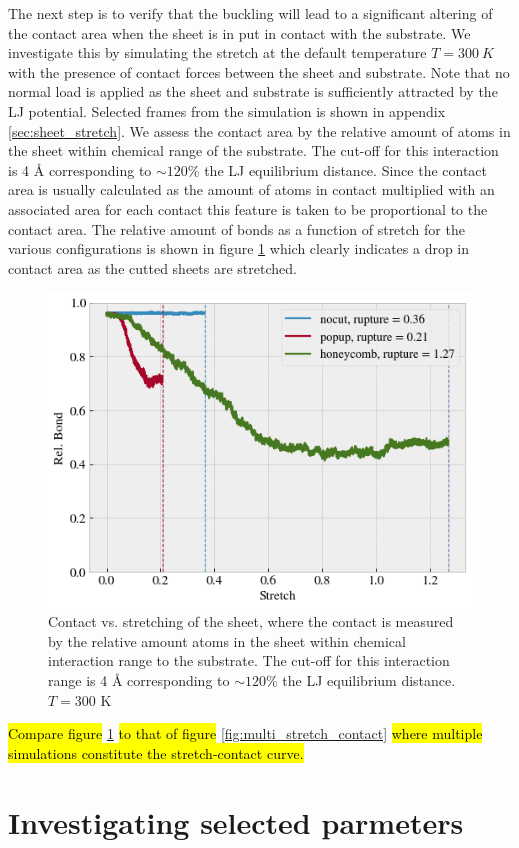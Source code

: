 The next step is to verify that the buckling will lead to a significant altering
of the contact area when the sheet is in put in contact with the substrate. We
investigate this by simulating the stretch at the default temperature $T =
\SI{300}{K}$ with the presence of contact forces between the sheet and
substrate. Note that no normal load is applied as the sheet and substrate is
sufficiently attracted by the LJ potential. Selected frames from the simulation is shown in appendix \cref{sec:sheet_stretch}. We assess the contact area by the
relative amount of atoms in the sheet within chemical range of the substrate.
The cut-off for this interaction is 4 Å corresponding to $\sim 120$\% the LJ
equilibrium distance. Since the contact area is usually calculated as the amount
of atoms in contact multiplied with an associated area for each contact this
feature is taken to be proportional to the contact area. The relative amount of
bonds as a function of stretch for the various configurations is shown in figure
\cref{fig:contact_vs_stretch} which clearly indicates a drop in contact area as
the cutted sheets are stretched. 

\begin{figure}[H]
  \centering
  \includegraphics[width=0.6\linewidth]{figures/baseline/contact_vs_stretch.png}
  \caption{Contact vs. stretching of the sheet, where the contact is measured by the relative amount atoms in the sheet within chemical interaction range to the substrate. The cut-off for this interaction range is 4 Å corresponding to $\sim 120 \%$ the LJ equilibrium distance. $T = 300$ K }
  \label{fig:contact_vs_stretch}
\end{figure}

\hl{Compare figure} \cref{fig:contact_vs_stretch} \hl{to that of figure} \cref{fig:multi_stretch_contact} \hl{where multiple simulations constitute the stretch-contact curve.}


\section{Investigating selected parmeters}

